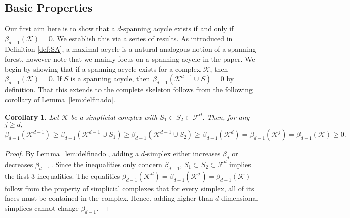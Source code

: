 \documentclass[12pt]{amsart}
\newcommand{\dy}[1]{\textcolor{magenta}{#1}}
\newcommand{\gt}[1]{\textcolor{blue}{#1}}
\newcommand{\remove}[1]{}
\renewcommand{\dy}[1]{#1}
\renewcommand{\gt}[1]{#1}
\newtheorem{corollary}[theorem]{Corollary}
\numberwithin{equation}{section}
\numberwithin{theorem}{section}
\newcommand{\1}{\mathbf{1}}
\def\F{\mathcal{F}}
\def\K{\mathcal{K}}
\begin{document}
\subsection{Basic Properties}

\gt{Our first aim here is to show} that a \gt{$d$-spanning acycle} exists if and only if \gt{$\beta_{d-1}(\K)=0.$} \gt{We establish this via a series of results.} \dy{As introduced in Definition \ref{def:SA}, a maximal acycle  is a natural analogous notion of a spanning forest, however \gt{note that} we mainly focus on a spanning acycle in the paper.} We \gt{begin by showing} that if a spanning acycle exists for a complex $\K$, then $\beta_{d-1}(\K) = 0$. \gt{If $S$ is a spanning acycle, then $\beta_{d - 1}(\K^{d - 1} \cup S) = 0$  by definition.} \remove{
By definition, a spanning acycle must have $\beta_{k-1}(\K^{d-1})=0$.} That this extends to the complete skeleton follows from the following corollary of Lemma~\ref{lem:delfinado}.


\begin{corollary}
\label{cor:dAndHighFacesUnaffectBettid-1}
Let $\K$ be a simplicial complex with $S_1 \subset S_2 \subset \F^d.$ Then, for any $j \geq d,$
\[
\beta_{d - 1}(\K^{d - 1}) \geq  \beta_{d - 1}(\K^{d - 1} \cup S_1) \geq \beta_{d - 1}(\K^{d - 1} \cup S_2) \geq \beta_{d - 1}(\K^d) = \beta_{d - 1}(\K^j) = \beta_{d - 1}(\K) \geq 0.
\]
\end{corollary}
\begin{proof}
By Lemma~\ref{lem:delfinado}, adding a $d$-simplex \gt{either increases} $\beta_d $ or  \gt{decreases} $\beta_{d-1}$. Since the inequalities only concern $\beta_{d-1}$,  $S_1 \subset S_2 \subset \F^d$ implies the first 3 inequalities. The equalities $\beta_{d - 1}(\K^d) = \beta_{d - 1}(\K^j) = \beta_{d - 1}(\K)$ follow from the property of simplicial complexes that for every simplex, all of its faces must be contained in the complex. Hence, \gt{adding} higher than $d$-dimensional simplices cannot change $\beta_{d-1}$.
\end{proof}
\end{document}
